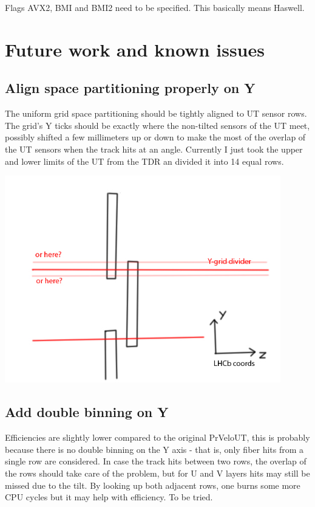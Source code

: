 \documentclass[12pt]{article}
\begin{document}
Flags AVX2, BMI and BMI2 need to be specified. This basically means Haswell.



\newpage
\section{Future work and known issues}

\subsection{Align space partitioning properly on Y}

The uniform grid space partitioning should be tightly aligned to UT sensor rows. The grid's Y ticks should be exactly where the non-tilted sensors of the UT meet, possibly shifted a few millimeters up or down to make the most of the overlap of the UT sensors when the track hits at an angle. Currently I just took the upper and lower limits of the UT from the TDR an divided it into 14 equal rows.

\includegraphics[width=0.9\textwidth]{images/y_grid_align.jpg}

\newpage
\subsection{Add double binning on Y}

Efficiencies are slightly lower compared to the original PrVeloUT, this is probably because there is no double binning on the Y axis - that is, only fiber hits from a single row are considered. In case the track hits between two rows, the overlap of the rows should take care of the problem, but for U and V layers hits may still be missed due to the tilt. By looking up both adjacent rows, one burns some more CPU cycles but it may help with efficiency. To be tried.
\end{document}
